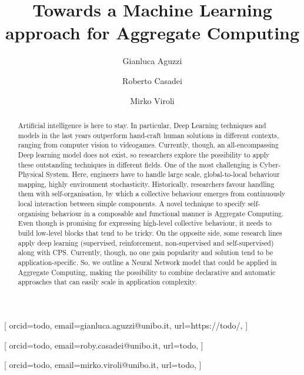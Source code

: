 \documentclass[
]{ceurart}
\begin{document}


\title{Towards a Machine Learning approach for Aggregate Computing} %

\author[1]{Gianluca Aguzzi}[%
orcid=todo,
email=gianluca.aguzzi@unibo.it,
url=https://todo/,
]
\author[2]{Roberto Casadei}[%
orcid=todo,
email=roby.casadei@unibo.it,
url=todo,
]
\author[2]{Mirko Viroli}[%
orcid=todo,
email=mirko.viroli@unibo.it,
url=todo,
]
\address[1]{Alma Mater Studiorum - Università di Bologna,
  Cesena, Italy}
\begin{abstract}
  Artificial intelligence is here to stay. 
  In particular, Deep Learning techniques and models in the last years outperform hand-craft human solutions in different contexts, ranging from computer vision to videogames.
  Currently, though, an all-encompassing Deep learning model does not exist, so researchers explore the possibility to apply these outstanding techniques in different fields.
  One of the most challenging is Cyber-Physical System. Here, engineers have to handle large scale, global-to-local behaviour mapping,
  highly environment stochasticity. 
  Historically, researchers favour handling them with self-organisation, by which a collective behaviour emerges from continuously local interaction between simple components.
  A novel technique to specify self-organising behaviour in a composable and functional manner is Aggregate Computing. Even though is promising for expressing high-level collective behaviour, 
  it needs to build low-level blocks that tend to be tricky. 
  On the opposite side, some research lines apply deep learning (supervised, reinforcement, non-supervised and self-supervised)
  along with CPS. Currently, though, no one gain popularity and solution tend to be application-specific.
  So, we outline a Neural Network model that could be applied in Aggregate Computing, making the possibility to combine declarative and automatic approaches that can easily scale in application complexity.
\end{abstract}
\end{document}
